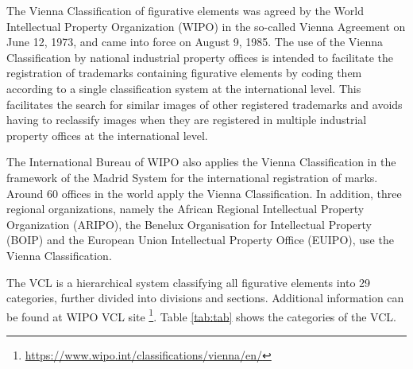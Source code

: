\documentclass{article}
\begin{document}
The Vienna Classification of figurative elements was agreed by the World Intellectual Property Organization (WIPO) in the so-called Vienna Agreement on June 12, 1973, and came into force on August 9, 1985. The use of the Vienna Classification by national industrial property offices is intended to facilitate the registration of trademarks containing figurative elements by coding them according to a single classification system at the international level. This facilitates the search for similar images of other registered trademarks and avoids having to reclassify images when they are registered in multiple industrial property offices at the international level.

The International Bureau of WIPO also applies the Vienna Classification in the framework of the Madrid System for the international registration of marks. Around 60 offices in the world apply the Vienna Classification. In addition, three regional organizations, namely the African Regional Intellectual Property Organization (ARIPO), the Benelux Organisation for Intellectual Property (BOIP) and the European Union Intellectual Property Office (EUIPO), use the Vienna Classification. 


The VCL is a hierarchical system classifying all figurative elements into 29 categories, further divided into divisions and sections. Additional information can be found at WIPO VCL site \footnote{\url{https://www.wipo.int/classifications/vienna/en/}}. Table \ref{tab:tab} shows the categories of the VCL.
\end{document}
